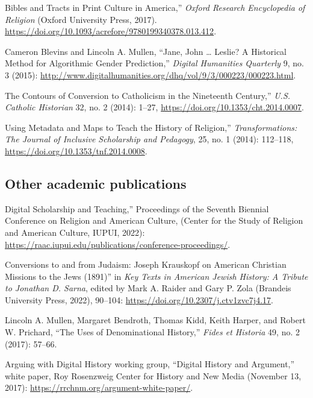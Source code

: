 \documentclass[11pt]{article}
\begin{document}
\noindent{}Bibles and Tracts in Print Culture in America,'' \emph{Oxford Research Encyclopedia of Religion} (Oxford University Press, 2017). \url{https://doi.org/10.1093/acrefore/9780199340378.013.412}.

Cameron Blevins and Lincoln A. Mullen, ``Jane, John \ldots{} Leslie? A Historical Method for Algorithmic Gender Prediction,'' \emph{Digital Humanities Quarterly} 9, no. 3 (2015): \url{http://www.digitalhumanities.org/dhq/vol/9/3/000223/000223.html}. 

\noindent{}The Contours of Conversion to Catholicism in the Nineteenth Century,'' \emph{U.S. Catholic Historian} 32, no. 2 (2014): 1--27, \url{https://doi.org/10.1353/cht.2014.0007}. 

\noindent{}Using Metadata and Maps to Teach the History of Religion,'' \emph{Transformations: The Journal of Inclusive Scholarship and Pedagogy}, 25, no. 1 (2014): 112--118, \url{https://doi.org/10.1353/tnf.2014.0008}.


\subsection{Other academic publications}\label{Other publications}

\noindent{}Digital Scholarship and Teaching,'' Proceedings of the Seventh Biennial Conference on Religion and American Culture, (Center for the Study of Religion and American Culture, IUPUI, 2022): \url{https://raac.iupui.edu/publications/conference-proceedings/}.

\noindent{}Conversions to and from Judaism: Joseph Krauskopf on American Christian Missions to the Jews (1891)'' in \emph{Key Texts in American Jewish History: A Tribute to Jonathan D. Sarna}, edited by Mark A. Raider and Gary P. Zola (Brandeis University Press, 2022), 90--104: \url{https://doi.org/10.2307/j.ctv1zvc7j4.17}.

Lincoln A. Mullen, Margaret Bendroth, Thomas Kidd, Keith Harper, and Robert W.  Prichard, ``The Uses of Denominational History,'' \emph{Fides et Historia} 49, no. 2 (2017): 57--66.

Arguing with Digital History working group, ``Digital History and Argument,'' white paper, Roy Rosenzweig Center for History and New Media (November 13, 2017): \url{https://rrchnm.org/argument-white-paper/}.
\end{document}
